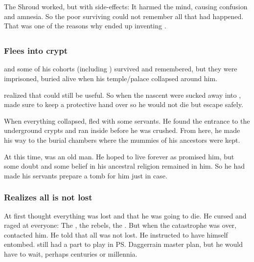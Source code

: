 The Shroud worked, but with side-effects: 
It harmed the mind, causing confusion and amnesia. 
So the poor surviving \nephilim{} could not remember all that had happened. 
That was one of the reasons why \Merkyrah{} ended up inventing . 










\subsection[Semiza]{\Semiza}





\subsubsection{Flees into crypt}
\Semiza{} and some of his cohorts (including \Eshayzal) survived and remembered, but they were imprisoned, buried alive when his temple/palace collapsed around him. 

\Daggerrain{} realized that \Semiza{} could still be useful. 
So when the nascent \resphain{} were sucked away into \Nyx{}, \Daggerrain{} made sure to keep a protective hand over \Semiza so he would not die but escape safely. 

When everything collapsed, \Semiza fled with some servants. 
He found the entrance to the underground crypts and ran inside before he was crushed.
From here, he made his way to the burial chambers where the mummies of his ancestors were kept. 

At this time, \Semiza was an old man. 
He hoped to live forever as \Daggerrain promised him, but some doubt and some belief in his ancestral religion remained in him. 
So he had made his servants prepare a tomb for him just in case. 





\subsubsection{Realizes all is not lost}
At first \Semiza{} thought everything was lost and that he was going to die. 
He cursed and raged at everyone: 
The \dragons, the rebels, the \banes. 
But when the catastrophe was over, \Daggerrain contacted him.
He told \Semiza that all was not lost. 
He instructed \Semiza to have himself entombed. 
\Semiza still had a part to play in \ps{Daggerrain} master plan, but he would have to wait, perhaps centuries or millennia. 

